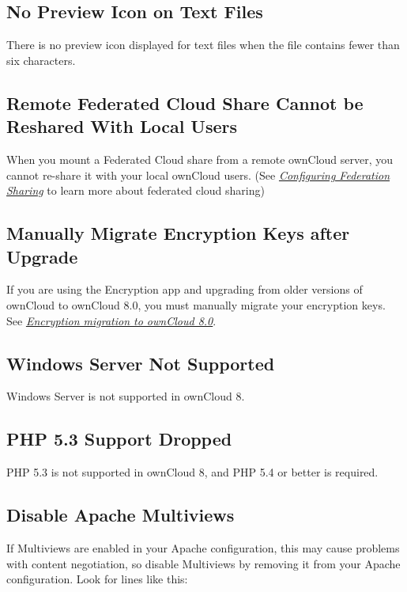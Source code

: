 \documentclass[letterpaper,10pt,english]{sphinxmanual}
\begin{document}
\subsection{No Preview Icon on Text Files}
\label{release_notes:no-preview-icon-on-text-files}
There is no preview icon displayed for text files when the file contains fewer than six characters.


\subsection{Remote Federated Cloud Share Cannot be Reshared With Local Users}
\label{release_notes:remote-federated-cloud-share-cannot-be-reshared-with-local-users}
When you mount a Federated Cloud share from a remote ownCloud server, you cannot re-share it with
your local ownCloud users. (See {\hyperref[configuration_files/federated_cloud_sharing_configuration::doc]{\emph{Configuring Federation Sharing}}}
to learn more about federated cloud sharing)


\subsection{Manually Migrate Encryption Keys after Upgrade}
\label{release_notes:manually-migrate-encryption-keys-after-upgrade}
If you are using the Encryption app and upgrading from older versions of
ownCloud to ownCloud 8.0, you must manually migrate your encryption keys.
See {\hyperref[configuration_files/encryption_configuration:upgrading-encryption-label]{\emph{Encryption migration to ownCloud 8.0}}}.


\subsection{Windows Server Not Supported}
\label{release_notes:windows-server-not-supported}
Windows Server is not supported in ownCloud 8.


\subsection{PHP 5.3 Support Dropped}
\label{release_notes:php-5-3-support-dropped}
PHP 5.3 is not supported in ownCloud 8, and PHP 5.4 or better is required.


\subsection{Disable Apache Multiviews}
\label{release_notes:disable-apache-multiviews}
If Multiviews are enabled in your Apache configuration, this may cause problems
with content negotiation, so disable Multiviews by removing it from your Apache
configuration. Look for lines like this:
\end{document}

